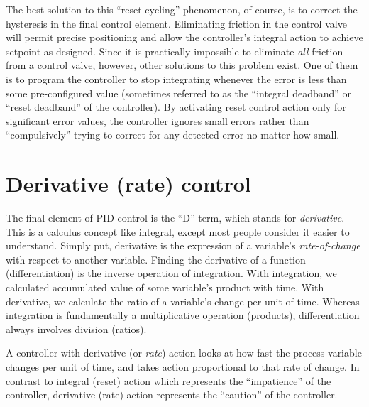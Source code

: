The best solution to this ``reset cycling'' phenomenon, of course, is to correct the hysteresis in the final control element.  Eliminating friction in the control valve will permit precise positioning and allow the controller's integral action to achieve setpoint as designed.  Since it is practically impossible to eliminate \textit{all} friction from a control valve, however, other solutions to this problem exist.  One of them is to program the controller to stop integrating whenever the error is less than some pre-configured value (sometimes referred to as the ``integral deadband'' or ``reset deadband'' of the controller).  By activating reset control action only for significant error values, the controller ignores small errors rather than ``compulsively'' trying to correct for any detected error no matter how small.        











\filbreak
\section{Derivative (rate) control}

The final element of PID control is the ``D'' term, which stands for \textit{derivative}.  This is a calculus concept like integral, except most people consider it easier to understand.  Simply put, derivative is the expression of a variable's \textit{rate-of-change} with respect to another variable.  Finding the derivative of a function (differentiation) is the inverse operation of integration.  With integration, we calculated accumulated value of some variable's product with time.  With derivative, we calculate the ratio of a variable's change per unit of time.  Whereas integration is fundamentally a multiplicative operation (products), differentiation always involves division (ratios).  

A controller with derivative (or \textit{rate}) action looks at how fast the process variable changes per unit of time, and takes action proportional to that rate of change.  In contrast to integral (reset) action which represents the ``impatience'' of the controller, derivative (rate) action represents the ``caution'' of the controller.

